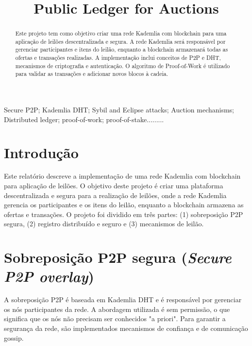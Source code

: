\documentclass[conference]{IEEEtran}
\begin{document}
    \title{Public Ledger for Auctions}

    \author{
    \and
    \and
    }

    \maketitle
    \begin{abstract}
        Este projeto tem como objetivo criar uma rede Kademlia com blockchain para uma aplicação de leilões descentralizada e segura. A rede Kademlia será responsável por gerenciar participantes e itens do leilão, enquanto a blockchain armazenará todas as ofertas e transações realizadas. A implementação inclui conceitos de P2P e DHT, mecanismos de criptografia e autenticação. O algoritmo de Proof-of-Work é utilizado para validar as transações e adicionar novos blocos à cadeia.

    \end{abstract}


    \begin{IEEEkeywords}
        Secure P2P; Kademlia DHT; Sybil and Eclipse attacks; Auction mechanisms; Distributed ledger; proof-of-work; proof-of-stake.........
    \end{IEEEkeywords}


    \section{Introdução}
    Este relatório descreve a implementação de uma rede Kademlia com blockchain para aplicação de leilões. O objetivo deste projeto é criar uma plataforma descentralizada e segura para a realização de leilões, onde a rede Kademlia gerencia os participantes e os itens do leilão, enquanto a blockchain armazena as ofertas e transações. O projeto foi dividido em três partes: (1) sobreposição P2P segura, (2) registro distribuído e seguro e (3) mecanismos de leilão.\\


    \section{Sobreposição P2P segura (\textit{Secure P2P overlay})}

    A sobreposição P2P é baseada em Kademlia DHT e é responsável por gerenciar os nós participantes da rede. A abordagem utilizada é sem permissão, o que significa que os nós não precisam ser conhecidos "a priori". Para garantir a segurança da rede, são implementados mecanismos de confiança e de comunicação gossip.
\end{document}
